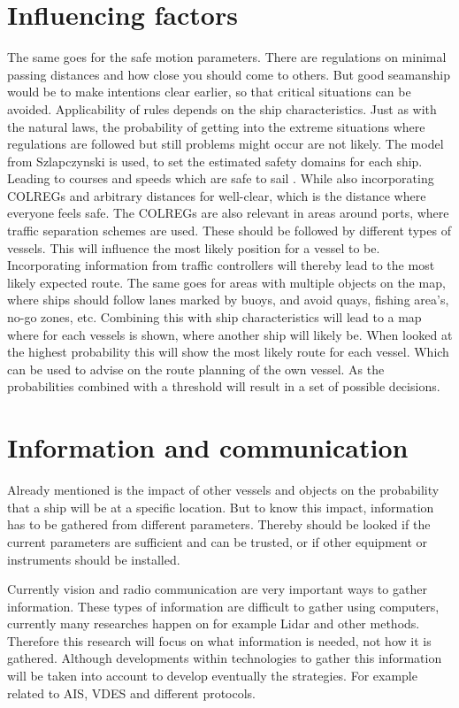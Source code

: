 \section{Influencing factors}
The same goes for the safe motion parameters. There are regulations on minimal passing distances and how close you should come to others. But good seamanship would be to make intentions clear earlier, so that critical situations can be avoided. Applicability of rules depends on the ship characteristics. Just as with the natural laws, the probability of getting into the extreme situations where regulations are followed but still problems might occur are not likely.
The model from Szlapczynski is used, to set the estimated safety domains for each ship. Leading to courses and speeds which are safe to sail \cite{Szlapczynski2017}. While also incorporating \ac{COLREGs} and arbitrary distances for well-clear, which is the distance where everyone feels safe.
The \ac{COLREGs} are also relevant in areas around ports, where traffic separation schemes are used. These should be followed by different types of vessels. This will influence the most likely position for a vessel to be. Incorporating information from traffic controllers will thereby lead to the most likely expected route. The same goes for areas with multiple objects on the map, where ships should follow lanes marked by buoys, and avoid quays, fishing area's, no-go zones, etc.
Combining this with ship characteristics will lead to a map where for each vessels is shown, where another ship will likely be. When looked at the highest probability this will show the most likely route for each vessel. Which can be used to advise on the route planning of the own vessel. As the probabilities combined with a threshold will result in a set of possible decisions.

\section{Information and communication}
Already mentioned is the impact of other vessels and objects on the probability that a ship will be at a specific location. But to know this impact, information has to be gathered from different parameters. Thereby should be looked if the current parameters are sufficient and can be trusted, or if other equipment or instruments should be installed.

Currently vision and radio communication are very important ways to gather information. These types of information are difficult to gather using computers, currently many researches happen on for example Lidar and other methods. Therefore this research will focus on what information is needed, not how it is gathered. Although developments within technologies to gather this information will be taken into account to develop eventually the strategies. For example related to \ac{AIS}, \ac{VDES} and different protocols.

